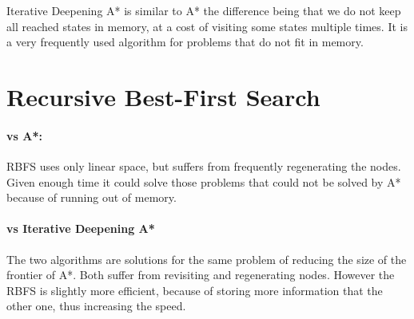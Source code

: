 Iterative Deepening A* is similar to A* the difference being that we do not keep all reached states in memory, at a cost of visiting some states multiple times. It is a very frequently used algorithm for problems that do not fit in memory.


\section{Recursive Best-First Search}

\paragraph{vs A*:} 

RBFS uses only linear space, but suffers from frequently regenerating the nodes. Given enough time it could solve those problems that could not be solved by A* because of running out of memory.

\paragraph{vs Iterative Deepening A*}

The two algorithms are solutions for the same problem of reducing the size of the frontier of A*. Both suffer from revisiting  and regenerating nodes. However the RBFS is slightly more efficient, because of storing more information that the other one, thus increasing the speed.
